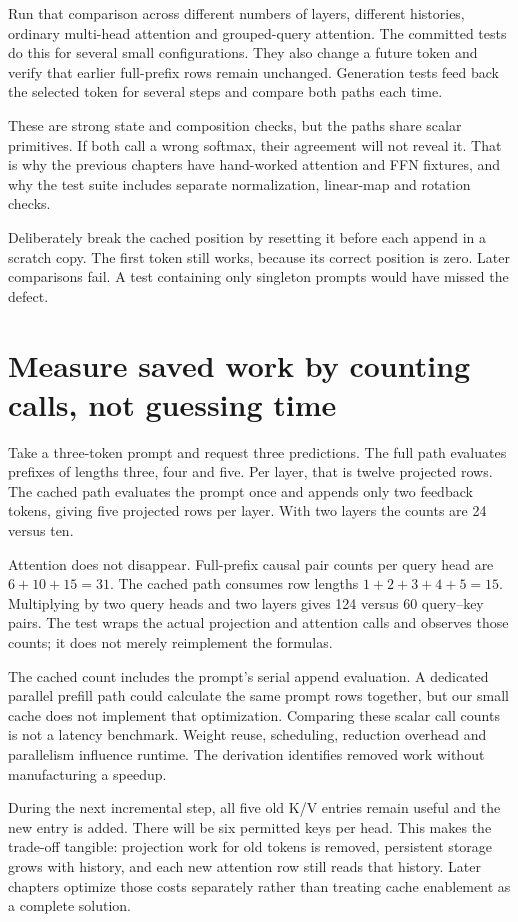 Run that comparison across different numbers of layers, different
histories, ordinary multi-head attention and grouped-query attention.
The committed tests do this for several small configurations. They
also change a future token and verify that earlier full-prefix rows
remain unchanged. Generation tests feed back the selected token for
several steps and compare both paths each time.

These are strong state and composition checks, but the paths share
scalar primitives. If both call a wrong softmax, their agreement will
not reveal it. That is why the previous chapters have hand-worked
attention and FFN fixtures, and why the test suite includes separate
normalization, linear-map and rotation checks.

Deliberately break the cached position by resetting it before each
append in a scratch copy. The first token still works, because its
correct position is zero. Later comparisons fail. A test containing
only singleton prompts would have missed the defect.

\section{Measure saved work by counting calls, not guessing time}
Take a three-token prompt and request three predictions. The full path
evaluates prefixes of lengths three, four and five. Per layer, that
is twelve projected rows. The cached path evaluates the prompt once
and appends only two feedback tokens, giving five projected rows per
layer. With two layers the counts are 24 versus ten.

Attention does not disappear. Full-prefix causal pair counts per query
head are $6+10+15=31$. The cached path consumes row lengths
$1+2+3+4+5=15$. Multiplying by two query heads and two layers gives
124 versus 60 query--key pairs. The test wraps the actual projection
and attention calls and observes those counts; it does not merely
reimplement the formulas.

The cached count includes the prompt's serial append evaluation.
A dedicated parallel prefill path could calculate the same prompt rows
together, but our small cache does not implement that optimization.
Comparing these scalar call counts is not a latency benchmark. Weight
reuse, scheduling, reduction overhead and parallelism influence runtime.
The derivation identifies removed work without manufacturing a speedup.

During the next incremental step, all five old K/V entries remain useful
and the new entry is added. There will be six permitted keys per head.
This makes the trade-off tangible: projection work for old tokens is
removed, persistent storage grows with history, and each new attention
row still reads that history. Later chapters optimize those costs
separately rather than treating cache enablement as a complete solution.

